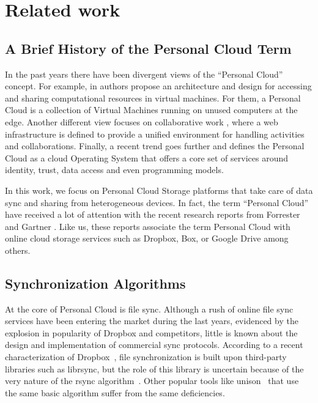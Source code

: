 \chapter{Related work}
\section{A Brief History of the Personal Cloud Term}

In the past years there have been divergent views of the ``Personal Cloud'' concept.  
For example, in \cite{hari2012personal} authors propose an architecture and design
for accessing and sharing computational resources in virtual machines. For them, a
Personal Cloud is a collection of Virtual Machines running on unused computers at the edge.
Another different view focuses on collaborative work \cite{ardissono2009service},  
where a web infrastructure is defined to provide a unified environment
for handling activities and collaborations. Finally, a recent trend \cite{windley}
 goes further and defines the Personal Cloud as a cloud Operating 
System that offers a core set of services around identity, trust, data access and 
even programming models.

In this work, we focus on Personal Cloud Storage platforms that take care of data
sync and sharing from heterogeneous devices. In fact,  the term ``Personal Cloud'' have
received a lot of attention with the recent research reports from Forrester \cite{forrester}
and Gartner \cite{gartner}. Like us, these reports associate the term Personal Cloud with
online cloud storage services such as Dropbox, Box, or Google Drive among others.

\section{Synchronization Algorithms}

At the core of Personal Cloud is file sync. Although a rush of online file sync services have
been entering the market during the last years, evidenced by the explosion in popularity of
Dropbox and competitors, little is known about the design and implementation of commercial
sync protocols. According to a recent characterization of Dropbox~\cite{drago2012inside}, file synchronization
is built upon third-party libraries such as librsync, but the role of this library is uncertain
because of the very nature of the rsync algorithm~\cite{tridgell96rsync}. Other popular tools like 
unison~\cite{unison} that use the same basic algorithm suffer from the same deficiencies.

